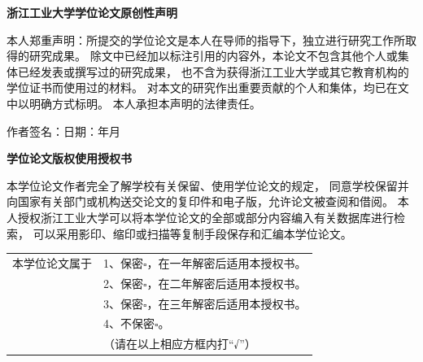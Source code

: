 
\clearpage
\thispagestyle{empty}

{ 
    \vspace*{24bp}
    \begin{center}
      \heiti\textbf{浙江工业大学学位论文原创性声明}
    \end{center}
    
    \doublespacing{}
    本人郑重声明：所提交的学位论文是本人在导师的指导下，独立进行研究工作所取得的研究成果。
    除文中已经加以标注引用的内容外，本论文不包含其他个人或集体已经发表或撰写过的研究成果，
    也不含为获得浙江工业大学或其它教育机构的学位证书而使用过的材料。
    对本文的研究作出重要贡献的个人和集体，均已在文中以明确方式标明。
    本人承担本声明的法律责任。
    
    作者签名：\hfill 日期： 年 月 \hspace*{6em}
    
    \vspace*{24bp}
    \begin{center}
    \heiti\textbf{学位论文版权使用授权书}
    \end{center}
    
    \doublespacing{}
    本学位论文作者完全了解学校有关保留、使用学位论文的规定，
    同意学校保留并向国家有关部门或机构送交论文的复印件和电子版，允许论文被查阅和借阅。
    本人授权浙江工业大学可以将本学位论文的全部或部分内容编入有关数据库进行检索，
    可以采用影印、缩印或扫描等复制手段保存和汇编本学位论文。
    
    \begin{table}[!h]
      \renewcommand\arraystretch{1.5}
      \begin{tabular}{ll}
        \hspace{1.5em}本学位论文属于 & 1、保密$\square$，在一年解密后适用本授权书。\\
        & 2、保密$\square$，在二年解密后适用本授权书。 \\
        & 3、保密$\square$，在三年解密后适用本授权书。 \\
        & 4、不保密$\square$。 \\
        & （请在以上相应方框内打“√”） \\
      \end{tabular}
    \end{table}
    
}
